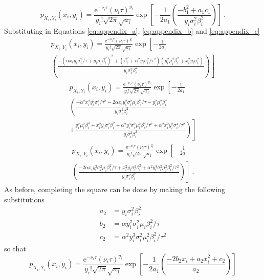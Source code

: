 \documentclass[12pt]{report}
\newcommand{\euler}{\mathrm{e}}
\begin{document}
\begin{equation*}
p_{X_i,Y_i}\left(x_i,y_i\right)=\frac{\euler^{-\nu_i\tau}(\nu_i\tau)^{y_i}}{y_i!\sqrt{2\pi}\sqrt{a_1}}
\exp\left[-\frac{1}{2a_1}\left(\frac{-b_1^2+a_1c_1}{y_i\sigma_i^2\beta_i^2}\right)
\right] \ .
\end{equation*}
Substituting in Equations \eqref{eq:appendix_a}, \eqref{eq:appendix_b} and \eqref{eq:appendix_c}
\begin{multline*}
p_{X_i,Y_i}\left(x_i,y_i\right)=\frac{\euler^{-\nu_i\tau}(\nu_i\tau)^{y_i}}{y_i!\sqrt{2\pi}\sqrt{a_1}}
\exp\left[-\frac{1}{2a_1}
\right.
\\
\left.
\left(\frac{-\left(\alpha x_iy_i\sigma_i^2/\tau+y_i\mu_i\beta_i^2\right)^2+\left(\beta_i^2+\alpha^2y_i\sigma_i^2/\tau^2\right)\left(y_i^2\mu_i^2\beta_i^2+x_i^2y_i\sigma_i^2\right)}{y_i\sigma_i^2\beta_i^2}\right)
\right]
\end{multline*}
\begin{multline*}
p_{X_i,Y_i}\left(x_i,y_i\right)=\frac{\euler^{-\nu_i\tau}(\nu_i\tau)^{y_i}}{y_i!\sqrt{2\pi}\sqrt{a_1}}
\exp\left[-\frac{1}{2a_1}
\right.
\\
\left.
\left(\frac{-\alpha^2 x_i^2y_i^2\sigma_i^4/\tau^2-2\alpha x_iy_i^2\sigma_i^2\mu_i\beta_i^2/\tau-y_i^2\mu_i^2\beta_i^4}{y_i\sigma_i^2\beta_i^2}
\right.\right.
\\
\left.\left.
+\frac{y_i^2\mu_i^2\beta_i^4+x_i^2y_i\sigma_i^2\beta_i^2+\alpha^2y_i^3\sigma_i^2\mu_i^2\beta_i^2/\tau^2+\alpha^2x_i^2y_i^2\sigma_i^4/\tau^2}{y_i\sigma_i^2\beta_i^2}\right)
\right]
\end{multline*}
\begin{multline*}
p_{X_i,Y_i}\left(x_i,y_i\right)=\frac{\euler^{-\nu_i\tau}(\nu_i\tau)^{y_i}}{y_i!\sqrt{2\pi}\sqrt{a_1}}
\exp\left[-\frac{1}{2a_1}
\right.
\\
\left.
\left(\frac{-2\alpha x_iy_i^2\sigma_i^2\mu_i\beta_i^2/\tau+x_i^2y_i\sigma_i^2\beta_i^2+\alpha^2y_i^3\sigma_i^2\mu_i^2\beta_i^2/\tau^2}{y_i\sigma_i^2\beta_i^2}\right)
\right] \ .
\end{multline*}
As before, completing the square can be done by making the following substitutions
\begin{align}
a_2 &= y_i\sigma_i^2\beta_i^2 \\
b_2 &= \alpha y_i^2\sigma_i^2\mu_i\beta_i^2/\tau \\
c_2 &= \alpha^2y_i^3\sigma_i^2\mu_i^2\beta_i^2/\tau^2
\end{align}
so that
\begin{equation*}
p_{X_i,Y_i}\left(x_i,y_i\right)=\frac{\euler^{-\nu_i\tau}(\nu_i\tau)^{y_i}}{y_i!\sqrt{2\pi}\sqrt{a_1}}
\exp\left[-\frac{1}{2a_1}
\left(\frac{-2b_2x_i+a_2x_i^2+c_2}{a_2}\right)
\right]
\end{equation*}
\end{document}
